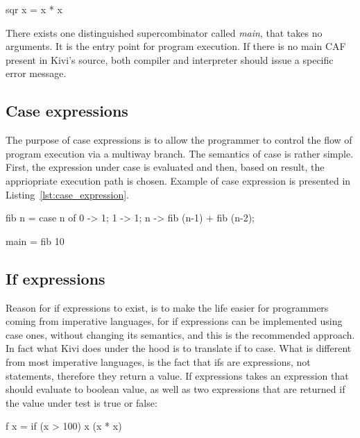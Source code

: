 \documentclass[12pt,a4paper]{report}
\begin{document}
\vspace*{0.2in}
\begin{code}[style=haskell,label=supercombinator_ex,caption={Simple supercombinator.}]
sqr x = x * x
\end{code}

There exists one distinguished supercombinator called \textit{main}, that takes
no arguments. It is the entry point for program execution. If there is no main
CAF present in Kivi's source, both compiler and interpreter should issue a
specific error message.

\subsection{Case expressions}
The purpose of case expressions is to allow the programmer to control the flow
of program execution via a multiway branch. The semantics of case is rather
simple. First, the expression under case is evaluated and then, based on result,
the appriopriate execution path is chosen. Example of case expression is
presented in Listing~\ref{lst:case_expression}.

\vspace*{0.2in}
\begin{code}[style=haskell,label=lst:case_expression,caption={Fibonacci with case}]
fib n =
    case n of
        0 -> 1;
        1 -> 1;
        n -> fib (n-1) + fib (n-2);

main = fib 10
\end{code}

\subsection{If expressions}
Reason for if expressions to exist, is to make the life easier for programmers
coming from imperative languages, for if expressions can be implemented using
case ones, without changing its semantics, and this is the recommended
approach.  In fact what Kivi does under the hood is to translate if to case.
What is different from most imperative languages, is the fact that ifs are
expressions, not statements, therefore they return a value. If expressions
takes an expression that should evaluate to boolean value, as well as two
expressions that are returned if the value under test is true or
false:

\vspace*{0.2in}
\begin{code}[style=haskell,label=lst:if_expression,caption={Fibonacci with case}]
f x = if (x > 100) x (x * x)
\end{code}
\end{document}
